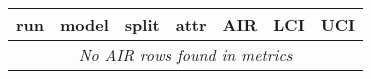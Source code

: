 \begin{tabular}{llllrrr}
\toprule
run & model & split & attr & AIR & LCI & UCI\\
\midrule
\multicolumn{7}{c}{\emph{No AIR rows found in metrics}}\\
\bottomrule
\end{tabular}
